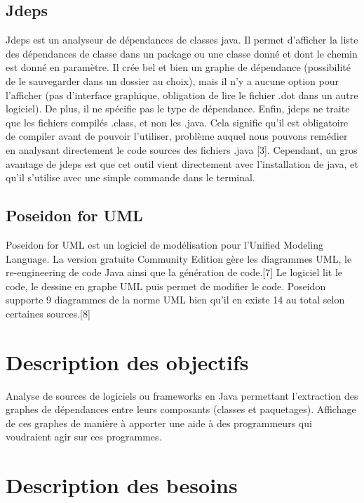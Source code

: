\documentclass{article}
\begin{document}
\subsection{Jdeps}
Jdeps est un analyseur de dépendances de classes java. Il permet d'afficher la liste des dépendances de classe dans un package ou une classe donné et dont le chemin est donné en paramètre. Il crée bel et bien un graphe de dépendance (possibilité de le sauvegarder dans un dossier au choix), mais il n'y a aucune option pour l'afficher (pas d'interface graphique, obligation de lire le fichier .dot dans un autre logiciel). De plus, il ne spécifie pas le type de dépendance. Enfin, jdeps ne traite que les fichiers compilés .class, et non les .java. Cela signifie qu'il est obligatoire de compiler avant de pouvoir l'utiliser, problème auquel nous pouvons remédier en analysant directement le code sources des fichiers .java [3]. Cependant, un gros avantage de jdeps est que cet outil vient directement avec l'installation de java, et qu'il s'utilise avec une simple commande dans le terminal.
\subsection{Poseidon for UML}
Poseidon for UML est un logiciel de modélisation pour l'Unified Modeling Language.
La version gratuite Community Edition gère les diagrammes UML, le re-engineering de code Java ainsi que la génération de code.[7] Le logiciel lit le code, le dessine en graphe UML puis permet de modifier le code. Poseidon supporte 9 diagrammes de la norme UML bien qu'il en existe 14 au total selon certaines sources.[8]

\section{Description des objectifs}
Analyse de sources de logiciels ou frameworks en Java
permettant l’extraction des graphes de dépendances entre
leurs composants (classes et paquetages).
Affichage de ces graphes de manière à apporter une aide à des
programmeurs qui voudraient agir sur ces programmes.

\section{Description des besoins}
\end{document}
